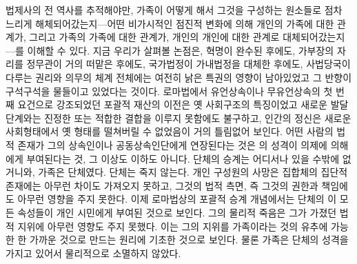 법제사의 전 역사를 추적해야만,
가족이 어떻게 해서 그것을 구성하는 원소들로 점차 느리게
해체되어갔는지---어떤 비가시적인 점진적 변화에 의해
개인의 가족에 대한 관계가,
그리고 가족의 가족에 대한 관계가,
개인의 개인에 대한 관계로 대체되어갔는지---를
이해할 수 있다.
지금 우리가 살펴볼 논점은,
혁명이 완수된 후에도,
가부장의 자리를 정무관이 거의 떠맡은 후에도,
국가법정이 가내법정을 대체한 후에도,
사법당국이 다루는 권리와 의무의 체계 전체에는 여전히
낡은 특권의 영향이 남아있었고 그 반향이 구석구석을 물들이고 있었다는 것이다.
로마법에서 유언상속이나 무유언상속의 첫 번째 요건으로 강조되었던
포괄적 재산의 이전은 옛 사회구조의 특징이었고
새로운 발달단계와는 진정한 또는 적합한 결합을 이루지 못함에도 불구하고,
인간의 정신은 새로운 사회형태에서 옛 형태를 떨쳐버릴 수 없었음이
거의 틀림없어 보인다.
어떤 사람의 법적 존재가 그의 상속인이나 공동상속인단에게
연장된다는 것은
의 성격이 의제에 의해 에게 부여된다는 것,
그 이상도 이하도 아니다.
단체의 승계는 어디서나 있을 수밖에 없거니와, 가족은 단체였다.
단체는 죽지 않는다.
개인 구성원의 사망은 집합체의 집단적 존재에는 아무런 차이도 가져오지 못하고,
그것의 법적 측면, 즉 그것의 권한과 책임에도 아무런 영향을 주지 못한다.
이제 로마법상의 포괄적 승계 개념에서는
단체의 이 모든 속성들이 개인 시민에게
부여된 것으로 보인다.
그의 물리적 죽음은 그가 가졌던 법적 지위에 아무런 영향도 주지 못했다.
이는 그의 지위를
가족이라는 것의 유추에 가능한 한 가까운 것으로 만드는
원리에 기초한 것으로 보인다.
물론 가족은 단체의 성격을 가지고 있어서 물리적으로 소멸하지 않았다.

